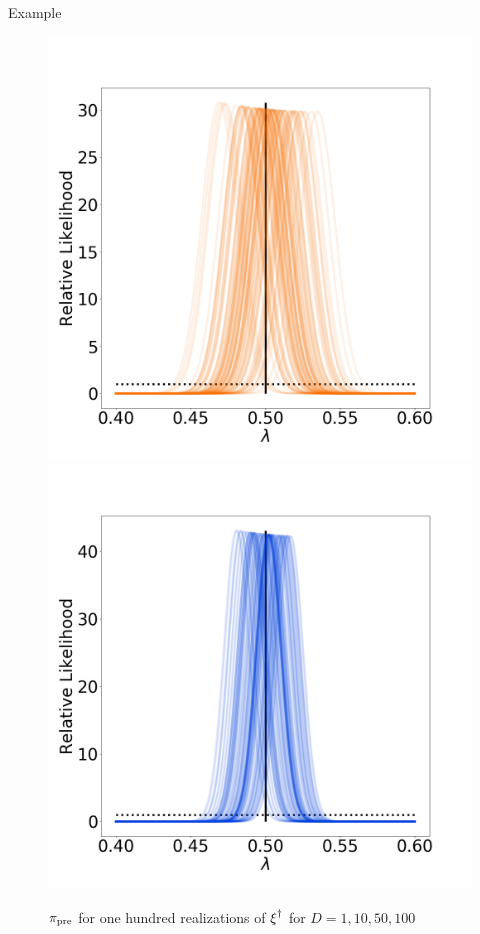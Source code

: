 \begin{block}{Example}
\begin{figure}
        \includegraphics[width=12cm]{updated_stability_D50_sigma-10E-4}
        \includegraphics[width=12cm]{updated_stability_D100_sigma-10E-4}
        \caption*{$\operatorname*{\pi_{pre}}$ for one hundred realizations of $\operatorname*{\xi}^\dagger$ for $D=1, 10, 50, 100$}
    \end{figure}

\end{block}
